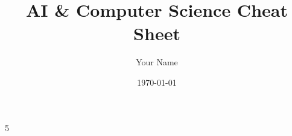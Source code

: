 \documentclass[10pt]{article}
\title{AI \& Computer Science Cheat Sheet}
\author{Your Name}
\date{\today}
\begin{document}
\begin{multicols*}{5}







\end{multicols*}
\end{document}
